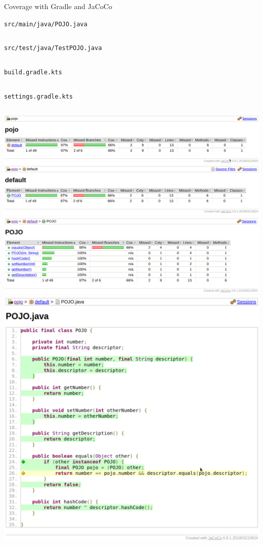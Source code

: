 \documentclass[presentation]{beamer}
\newcommand{\codefile}[4]{
	\begin{block}{\texttt{#2}}
		\inputminted[fontsize=#3,linenos=true,breaklines=true]{#4}{"workspace/#1/#2"}
	\end{block}
}
\newcommand{\java}[3]{\codefile{#1}{#2}{#3}{java}}
\newcommand{\kotlin}[3]{\codefile{#1}{#2}{#3}{kotlin}}
\newcommand{\tinier}{\fontsize{4pt}{5pt}\selectfont}
\begin{document}
\begin{frame}{Coverage with Gradle and JaCoCo}
    \java{19-Coverage}{src/main/java/POJO.java}{\tinier}
    \java{19-Coverage}{src/test/java/TestPOJO.java}{\tinier}
    \kotlin{19-Coverage}{build.gradle.kts}{\scriptsize}
    \kotlin{19-Coverage}{settings.gradle.kts}{\normalsize}
    \includegraphics[width=.9\textwidth,height=.8\textheight,keepaspectratio]{img/jacocoTestReport0}
    \includegraphics[width=.9\textwidth,height=.8\textheight,keepaspectratio]{img/jacocoTestReport1}
    \includegraphics[width=.9\textwidth,height=.8\textheight,keepaspectratio]{img/jacocoTestReport3}
    \includegraphics[width=.9\textwidth,height=.8\textheight,keepaspectratio]{img/jacocoTestReport4}
\end{frame}
\end{document}
